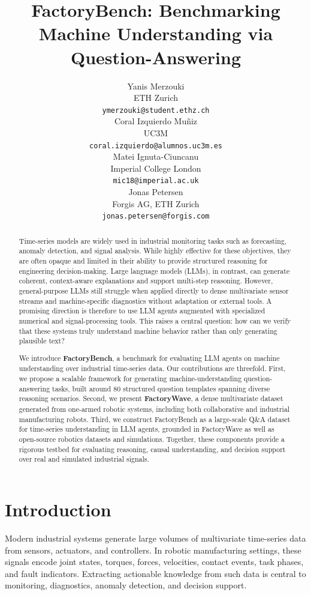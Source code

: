 \documentclass{article}
\title{FactoryBench: Benchmarking Machine Understanding via Question-Answering}
\author{%
  Yanis Merzouki \\
  ETH Zurich \\
  \texttt{ymerzouki@student.ethz.ch} \\
  \And
  Coral Izquierdo Muñiz \\
  UC3M \\
  \texttt{coral.izquierdo@alumnos.uc3m.es} \\
  \And
  Matei Ignuta-Ciuncanu \\
  Imperial College London \\
  \texttt{mic18@imperial.ac.uk} \\
  \And
  Jonas Petersen \\
  Forgis AG, ETH Zurich \\
  \texttt{jonas.petersen@forgis.com}
}
\begin{document}
\maketitle

\begin{abstract}
Time-series models are widely used in industrial monitoring tasks such as forecasting, anomaly detection, and signal analysis. While highly effective for these objectives, they are often opaque and limited in their ability to provide structured reasoning for engineering decision-making. Large language models (LLMs), in contrast, can generate coherent, context-aware explanations and support multi-step reasoning. However, general-purpose LLMs still struggle when applied directly to dense multivariate sensor streams and machine-specific diagnostics without adaptation or external tools. A promising direction is therefore to use LLM agents augmented with specialized numerical and signal-processing tools. This raises a central question: how can we verify that these systems truly understand machine behavior rather than only generating plausible text?

We introduce \textbf{FactoryBench}, a benchmark for evaluating LLM agents on machine understanding over industrial time-series data. Our contributions are threefold. First, we propose a scalable framework for generating machine-understanding question-answering tasks, built around 80 structured question templates spanning diverse reasoning scenarios. Second, we present \textbf{FactoryWave}, a dense multivariate dataset generated from one-armed robotic systems, including both collaborative and industrial manufacturing robots. Third, we construct FactoryBench as a large-scale Q\&A dataset for time-series understanding in LLM agents, grounded in FactoryWave as well as open-source robotics datasets and simulations. Together, these components provide a rigorous testbed for evaluating reasoning, causal understanding, and decision support over real and simulated industrial signals.
\end{abstract}

\section{Introduction}

Modern industrial systems generate large volumes of multivariate time-series data from sensors, actuators, and controllers. In robotic manufacturing settings, these signals encode joint states, torques, forces, velocities, contact events, task phases, and fault indicators. Extracting actionable knowledge from such data is central to monitoring, diagnostics, anomaly detection, and decision support.
\end{document}
